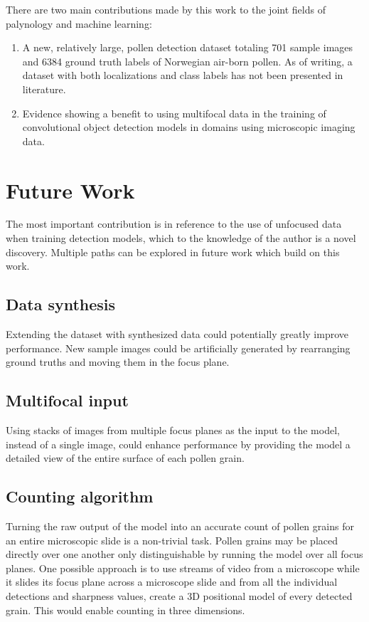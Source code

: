 There are two main contributions made by this work to the joint fields of palynology and machine learning:

\begin{enumerate}
    \item A new, relatively large, pollen detection dataset totaling 701 sample images and 6384 ground truth labels of Norwegian air-born pollen. As of writing, a dataset with both localizations and class labels has not been presented in literature.
    \item Evidence showing a benefit to using multifocal data in the training of convolutional object detection models in domains using microscopic imaging data.
\end{enumerate}

\section{Future Work}
The most important contribution is in reference to the use of unfocused data when training detection models, which to the knowledge of the author is a novel discovery.
Multiple paths can be explored in future work which build on this work.

\subsection*{Data synthesis}
Extending the dataset with synthesized data could potentially greatly improve performance.
New sample images could be artificially generated by rearranging ground truths and moving them in the focus plane.

\subsection*{Multifocal input}
Using stacks of images from multiple focus planes as the input to the model, instead of a single image, could enhance performance by providing the model a detailed view of the entire surface of each pollen grain.

\subsection*{Counting algorithm}
Turning the raw output of the model into an accurate count of pollen grains for an entire microscopic slide is a non-trivial task.
Pollen grains may be placed directly over one another only distinguishable by running the model over all focus planes.
One possible approach is to use streams of video from a microscope while it slides its focus plane across a microscope slide and from all the individual detections and sharpness values, create a 3D positional model of every detected grain.
This would enable counting in three dimensions.

